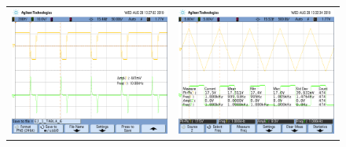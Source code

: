 \begin{figure}[H]
	\centering
	\begin{tabular}{c c}
		\includegraphics[scale=0.2]{Derivador/Mediciones/Osciloscopio/PCB_Compensado/EJ_1_TABLA_6.png} &
		\includegraphics[scale=0.2]{Derivador/Mediciones/Osciloscopio/PCB_Compensado/osc_4.png} \\

\end{tabular}
\end{figure}
